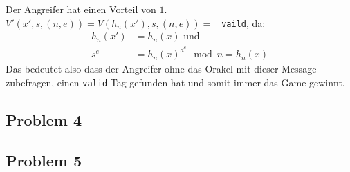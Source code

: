 \documentclass[12pt, german]{article}
\begin{document}
   	\noindent
   	Der Angreifer hat einen Vorteil von $1$. \\
   	$V'(x', s,(n,e)) = V(h_n(x'), s, (n,e)) = $ \texttt{ vaild}, da: 
   	\begin{align*}
   		h_n(x') &= h_n(x) \text{ und }\\
   		s^e &= h_n(x)^{d^{e}} \mod n = h_n(x)
   	\end{align*}
   	Das bedeutet also dass der Angreifer ohne das Orakel mit dieser Message zubefragen, einen \texttt{valid}-Tag gefunden hat und somit immer das Game gewinnt.
    
     \subsection*{Problem 4}
      \subsection*{Problem 5}
   
  

   	
    
\end{document}
